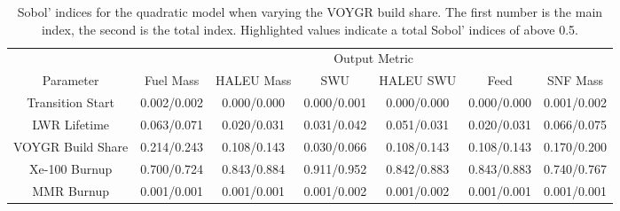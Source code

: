 \begin{table}[h!]
    \centering
    \caption{Sobol' indices for the quadratic model when varying the VOYGR 
    build share. The first number is the main index, the second is the total 
    index. Highlighted 
    values indicate a total Sobol' indices of above 0.5.}
    \label{tab:s7_sobol_voygr_quadratic}
    \begin{tabular}{c c c c c c c}
        \hline
        & \multicolumn{6}{c}{Output Metric} \\
        Parameter & Fuel Mass & HALEU Mass & SWU & HALEU SWU & Feed & SNF Mass \\
        \hline
        Transition Start & 0.002/0.002 & 0.000/0.000 & 0.000/0.001 &
                           0.000/0.000 & 0.000/0.000 & 0.001/0.002\\
        LWR Lifetime & 0.063/0.071 & 0.020/0.031 & 0.031/0.042 &
                       0.051/0.031 & 0.020/0.031 & 0.066/0.075\\
        VOYGR Build Share & 0.214/0.243 & 0.108/0.143 & 0.030/0.066 &
                            0.108/0.143 & 0.108/0.143 & 0.170/0.200\\
        Xe-100 Burnup & \cellcolor{green!25}0.700/0.724 & \cellcolor{green!25}0.843/0.884 & \cellcolor{green!25}0.911/0.952 &
        \cellcolor{green!25}0.842/0.883 &\cellcolor{green!25} 0.843/0.883 & \cellcolor{green!25}0.740/0.767\\
        MMR Burnup & 0.001/0.001 & 0.001/0.001 & 0.001/0.002 &
                     0.001/0.002 & 0.001/0.001 & 0.001/0.001\\
        \hline        
    \end{tabular}
\end{table}

